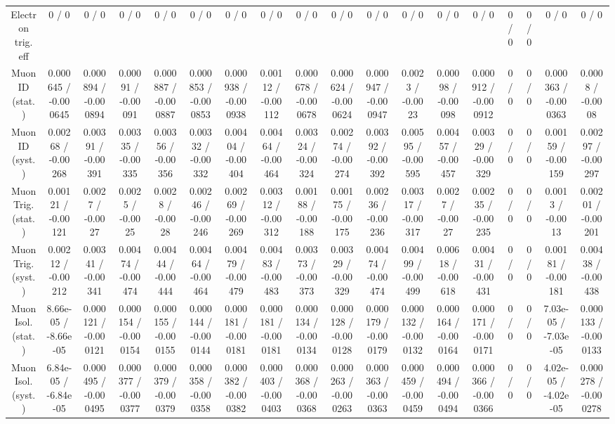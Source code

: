 \documentclass[10pt]{article}
\begin{document}
\begin{table}[htbp]
\begin{center}
\begin{tabular}{|c|c|c|c|c|c|c|c|c|c|c|c|c|c|c|c|c|c|}
  Electron trig. eff & 0 / 0 & 0 / 0 & 0 / 0 & 0 / 0 & 0 / 0 & 0 / 0 & 0 / 0 & 0 / 0 & 0 / 0 & 0 / 0 & 0 / 0 & 0 / 0 & 0 / 0 & 0 / 0 & 0 / 0 & 0 / 0 & 0 / 0 \\ 
  Muon ID (stat.) & 0.000645 / -0.000645 & 0.000894 / -0.000894 & 0.00091 / -0.00091 & 0.000887 / -0.000887 & 0.000853 / -0.000853 & 0.000938 / -0.000938 & 0.00112 / -0.00112 & 0.000678 / -0.000678 & 0.000624 / -0.000624 & 0.000947 / -0.000947 & 0.0023 / -0.0023 & 0.00098 / -0.00098 & 0.000912 / -0.000912 & 0 / 0 & 0 / 0 & 0.000363 / -0.000363 & 0.0008 / -0.0008 \\ 
  Muon ID (syst.) & 0.00268 / -0.00268 & 0.00391 / -0.00391 & 0.00335 / -0.00335 & 0.00356 / -0.00356 & 0.00332 / -0.00332 & 0.00404 / -0.00404 & 0.00464 / -0.00464 & 0.00324 / -0.00324 & 0.00274 / -0.00274 & 0.00392 / -0.00392 & 0.00595 / -0.00595 & 0.00457 / -0.00457 & 0.00329 / -0.00329 & 0 / 0 & 0 / 0 & 0.00159 / -0.00159 & 0.00297 / -0.00297 \\ 
  Muon Trig. (stat.) & 0.00121 / -0.00121 & 0.0027 / -0.0027 & 0.0025 / -0.0025 & 0.0028 / -0.0028 & 0.00246 / -0.00246 & 0.00269 / -0.00269 & 0.00312 / -0.00312 & 0.00188 / -0.00188 & 0.00175 / -0.00175 & 0.00236 / -0.00236 & 0.00317 / -0.00317 & 0.0027 / -0.0027 & 0.00235 / -0.00235 & 0 / 0 & 0 / 0 & 0.0013 / -0.0013 & 0.00201 / -0.00201 \\ 
  Muon Trig. (syst.) & 0.00212 / -0.00212 & 0.00341 / -0.00341 & 0.00474 / -0.00474 & 0.00444 / -0.00444 & 0.00464 / -0.00464 & 0.00479 / -0.00479 & 0.00483 / -0.00483 & 0.00373 / -0.00373 & 0.00329 / -0.00329 & 0.00474 / -0.00474 & 0.00499 / -0.00499 & 0.00618 / -0.00618 & 0.00431 / -0.00431 & 0 / 0 & 0 / 0 & 0.00181 / -0.00181 & 0.00438 / -0.00438 \\ 
  Muon Isol. (stat.) & 8.66e-05 / -8.66e-05 & 0.000121 / -0.000121 & 0.000154 / -0.000154 & 0.000155 / -0.000155 & 0.000144 / -0.000144 & 0.000181 / -0.000181 & 0.000181 / -0.000181 & 0.000134 / -0.000134 & 0.000128 / -0.000128 & 0.000179 / -0.000179 & 0.000132 / -0.000132 & 0.000164 / -0.000164 & 0.000171 / -0.000171 & 0 / 0 & 0 / 0 & 7.03e-05 / -7.03e-05 & 0.000133 / -0.000133 \\ 
  Muon Isol. (syst.) & 6.84e-05 / -6.84e-05 & 0.000495 / -0.000495 & 0.000377 / -0.000377 & 0.000379 / -0.000379 & 0.000358 / -0.000358 & 0.000382 / -0.000382 & 0.000403 / -0.000403 & 0.000368 / -0.000368 & 0.000263 / -0.000263 & 0.000363 / -0.000363 & 0.000459 / -0.000459 & 0.000494 / -0.000494 & 0.000366 / -0.000366 & 0 / 0 & 0 / 0 & 4.02e-05 / -4.02e-05 & 0.000278 / -0.000278 \\ 

\end{tabular}
\end{center}
\end{table}
\end{document}
